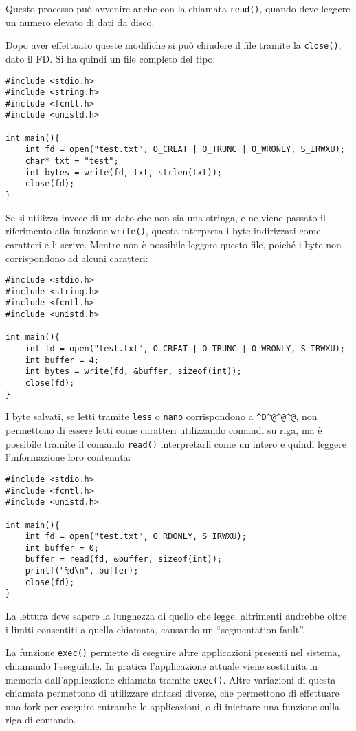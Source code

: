 \documentclass{article}
\numberwithin{equation}{subsection}
\begin{document}
Questo processo può avvenire anche con la chiamata \verb|read()|, quando deve leggere un numero elevato di dati da disco.  

Dopo aver effettuato queste modifiche si può chiudere il file tramite la \verb|close()|, dato il FD. Si ha quindi un file completo del tipo:
\begin{verbatim}
#include <stdio.h>
#include <string.h>
#include <fcntl.h>
#include <unistd.h>

int main(){
    int fd = open("test.txt", O_CREAT | O_TRUNC | O_WRONLY, S_IRWXU);
    char* txt = "test";
    int bytes = write(fd, txt, strlen(txt));
    close(fd);
}
\end{verbatim}

Se si utilizza invece di un dato che non sia una stringa, e ne viene passato il riferimento alla funzione \verb|write()|, questa interpreta i byte indirizzati come 
caratteri e li scrive. Mentre non è possibile leggere questo file, poiché i byte non corrispondono ad alcuni caratteri:
\begin{verbatim}
#include <stdio.h>
#include <string.h>
#include <fcntl.h>
#include <unistd.h>

int main(){
    int fd = open("test.txt", O_CREAT | O_TRUNC | O_WRONLY, S_IRWXU);
    int buffer = 4;
    int bytes = write(fd, &buffer, sizeof(int));
    close(fd);
}
\end{verbatim}

I byte salvati, se letti tramite \verb|less| o \verb|nano| corrispondono a \verb|^D^@^@^@|, non permettono di essere letti come caratteri utilizzando comandi su riga, ma 
è possibile tramite il comando \verb|read()| interpretarli come un intero e quindi leggere l'informazione loro contenuta:
\begin{verbatim}
#include <stdio.h>
#include <fcntl.h>
#include <unistd.h>

int main(){
    int fd = open("test.txt", O_RDONLY, S_IRWXU);
    int buffer = 0;
    buffer = read(fd, &buffer, sizeof(int));
    printf("%d\n", buffer);
    close(fd);
}
\end{verbatim}

La lettura deve sapere la lunghezza di quello che legge, altrimenti andrebbe oltre i limiti consentiti a quella chiamata, causando un ``segmentation fault''. 

La funzione \verb|exec()| permette di eseguire altre applicazioni presenti nel sistema, chiamando l'eseguibile. In pratica l'applicazione attuale viene sostituita in 
memoria dall'applicazione chiamata tramite \verb|exec()|. Altre variazioni di questa chiamata permettono di utilizzare sintassi diverse, che permettono di effettuare 
una fork per eseguire entrambe le applicazioni, o di iniettare una funzione sulla riga di comando. 
\end{document}
